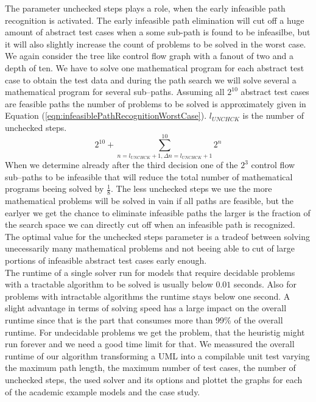 The parameter unchecked steps plays a role, when the early infeasible path recognition is activated. The early infeasible path elimination will cut off a huge amount of abstract test cases when a some sub-path is found to be infeasilbe, but it will also slightly increase the count of problems to be solved in the worst case. We again consider the tree like control flow graph with a fanout of two and a depth of ten. We have to solve one mathematical program for each abstract test case to obtain the test data and during the path search we will solve several a mathematical program for several sub--paths. Assuming all $2^{10}$ abstract test cases are feasible paths the number of problems to be solved is approximately given in Equation (\ref{eqn:infeasiblePathRecognitionWorstCase}). $l_{UNCHCK}$ is the number of unchecked steps.
\begin{equation}
2^{10}+\sum_{n=l_{UNCHCK}+1, \Delta n=l_{UNCHCK}+1}^{10}{2^n}
\label{eqn:infeasiblePathRecognitionWorstCase}
\end{equation}
When we determine already after the third decision one of the $2^3$ control flow sub--paths to be infeasible that will reduce the total number of mathematical programs beeing solved by $\frac{1}{8}$. The less unchecked steps we use the more mathematical problems will be solved in vain if all paths are feasible, but the earlyer we get the chance to eliminate infeasible paths the larger is the fraction of the search space we can directly cut off when an infeasible path is recognized. The optimal value for the unchecked steps parameter is a tradeof between solving unecessarily many mathematical problems and not beeing able to cut of large portions of infeasible abstract test cases early enough.
\\
The runtime of a single solver run for models that require decidable problems with a tractable algorithm to be solved is usually below $0.01$ seconds. Also for problems with intractable algorithms the runtime stays below one second. A slight advantage in terms of solving speed has a large impact on the overall runtime since that is the part that consumes more than 99\% of the overall runtime. For undecidable problems we get the problem, that the heuristig might run forever and we need a good time limit for that. 
We meassured the overall runtime of our algorithm transforming a UML  into a compilable unit test varying the maximum path length, the maximum number of test cases, the number of unchecked steps, the used solver and its options and plottet the graphs for each of the academic example models and the case study.
